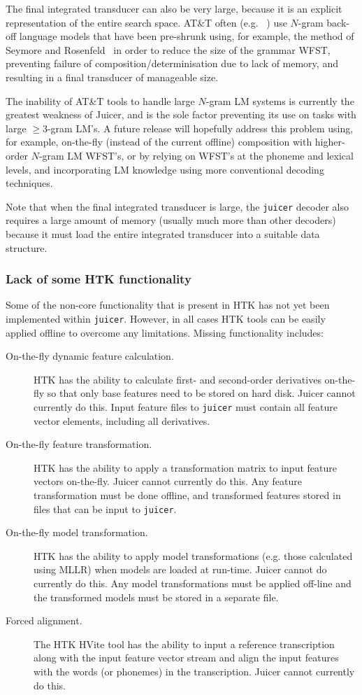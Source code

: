 \documentclass[a4paper,12pt]{report}
\begin{document}
The final integrated transducer can also be very large, because it is an explicit representation of the entire search space. AT\&T often (e.g. ~\cite{mohri98full}) use $N$-gram back-off language models that have been pre-shrunk using, for example, the method of Seymore and Rosenfeld~\cite{seymore96scalable} in order to reduce the size of the grammar WFST, preventing failure of composition/determinisation due to lack of memory, and resulting in a final transducer of manageable size.

The inability of AT\&T tools to handle large $N$-gram LM systems is currently the greatest weakness of Juicer, and is the sole factor preventing its use on tasks with large $\ge$3-gram LM's. A future release will hopefully address this problem using, for example, on-the-fly (instead of the current offline) composition with higher-order $N$-gram LM WFST's, or by relying on WFST's at the phoneme and lexical levels, and incorporating LM knowledge using more conventional decoding techniques.

Note that when the final integrated transducer is large, the {\tt juicer} decoder also requires a large amount of memory (usually much more than other decoders) because it must load the entire integrated transducer into a suitable data structure.


\subsubsection{Lack of some HTK functionality}

Some of the non-core functionality that is present in HTK has not yet been implemented within {\tt juicer}. However, in all cases HTK tools can be easily applied offline to overcome any limitations. Missing functionality includes:

\begin{description}
\item [On-the-fly dynamic feature calculation.] HTK has the ability to calculate first- and second-order derivatives on-the-fly so that only base features need to be stored on hard disk. Juicer cannot currently do this. Input feature files to {\tt juicer} must contain all feature vector elements, including all derivatives.
\item [On-the-fly feature transformation.] HTK has the ability to apply a transformation matrix to input feature vectors on-the-fly. Juicer cannot currently do this. Any feature transformation must be done offline, and transformed features stored in files that can be input to {\tt juicer}.
\item [On-the-fly model transformation.] HTK has the ability to apply model transformations (e.g. those calculated using MLLR) when models are loaded at run-time. Juicer cannot do currently do this. Any model transformations must be applied off-line and the transformed models must be stored in a separate file.
\item [Forced alignment.] The HTK HVite tool has the ability to input a reference transcription along with the input feature vector stream and align the input features with the words (or phonemes) in the transcription. Juicer cannot currently do this.
\end{description}
\end{document}
